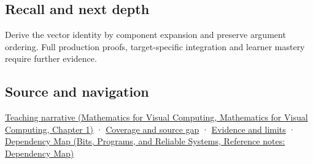 \subsection{Recall and next depth}\label{appendix-5caa058bd9c7-recall-and-next-depth}

Derive the vector identity by component expansion and preserve argument ordering. Full production proofs, target-specific integration and learner mastery require further evidence.

\subsection{Source and navigation}\label{appendix-5caa058bd9c7-source-and-navigation}

\href{../02-Mathematics-for-Visual-Computing/main.pdf\#nameddest=01-foundations-i-ch017-signed-volume-extends-the-same-idea-into-space}{Teaching narrative (Mathematics for Visual Computing, Mathematics for Visual Computing, Chapter 1)} · \hyperref[appendix-fd090d982a15-phase-6---parts-501-600]{Coverage and source gap} · \hyperref[appendix-a103e7846d21-phase-6---source-analysis-and-verification]{Evidence and limits} · \href{../01-Bits-Programs-and-Reliable-Systems/main.pdf\#nameddest=appendix-4ad47bdd269a}{Dependency Map (Bits, Programs, and Reliable Systems, Reference notes: Dependency Map)}
